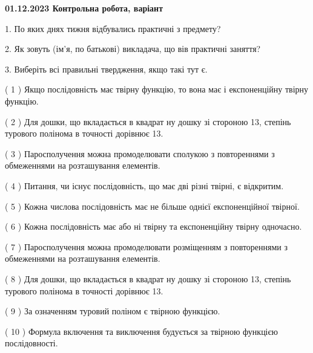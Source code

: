 \documentclass[12pt, ukrainian]{article}
\begin{document}
\vspace{4mm}
\newpage
\begin {large}

\textbf{01.12.2023 Контрольна робота, варіант  }\par


{
1. По яких днях тижня відбувались практичні з предмету?



\vspace{5mm}
2. Як зовуть (ім'я, по батькові) викладача, що вів практичні заняття?



\vspace{5mm}
3. Виберіть всі правильні твердження, якщо такі тут є.\par
\vspace{2mm}
( 1 ) Якщо послідовність має твірну функцію, то вона має і експоненційну твірну функцію.%

( 2 ) Для дошки, що вкладається в квадрат ну дошку зі стороною 13, степінь турового полінома в точності дорівнює 13.%

( 3 ) Паросполучення можна промоделювати сполукою з повтореннями з обмеженнями на розташування елементів.%

( 4 ) Питання, чи існує послідовність, що має дві різні твірні, є відкритим.%

( 5 ) Кожна числова послідовність має не більше однієї  експоненційної твірної.%

( 6 ) Кожна послідовність має або ні твірну та експоненційну твірну одночасно.%

( 7 ) Паросполучення можна промоделювати розміщенням з повтореннями з обмеженнями на розташування елементів.%

( 8 ) Для дошки, що вкладається в квадрат ну дошку зі стороною 13, степінь турового полінома в точності дорівнює 13.%

( 9 ) За означенням туровий поліном є твірною функцією.%

( 10 ) Формула включення та виключення будується за твірною функцією послідовності.%
}
\end {large}
\end{document}
